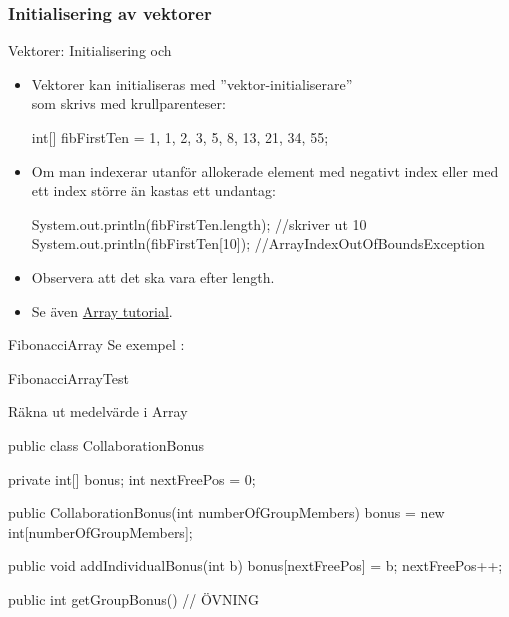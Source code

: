 \documentclass{lecturenotes}
\begin{document}
\subsubsection{Initialisering av vektorer}
\begin{Slide}{Vektorer: Initialisering och }
\begin{itemize} \footnotesize
\item Vektorer kan initialiseras med ''vektor-initialiserare'' \\ \href{https://docs.oracle.com/javase/specs/jls/se8/html/jls-10.html#jls-10.6}{} som skrivs med krullparenteser:
\begin{Code}
int[] fibFirstTen = {1, 1, 2, 3, 5, 8, 13, 21, 34, 55};
\end{Code}
\item  Om man indexerar utanför allokerade element med negativt index eller med ett index större än  kastas ett undantag:
\begin{Code}
System.out.println(fibFirstTen.length);  //skriver ut 10
System.out.println(fibFirstTen[10]); //ArrayIndexOutOfBoundsException
\end{Code}
\item  Observera att det  ska vara \code{()} efter length.
\item Se även \href{https://docs.oracle.com/javase/tutorial/java/nutsandbolts/arrays.html}{Array tutorial}.
\end{itemize}  
\end{Slide} 

\begin{Slide}{FibonacciArray}
Se exempel \href{https://github.com/bjornregnell/lth-eda016-2015/blob/master/lectures/examples/eclipse-ws/lecture-examples/src/week06/FibonacciArray.java}{}:

\end{Slide}

\begin{Slide}{FibonacciArrayTest}

\end{Slide}

\begin{Slide}{Räkna ut medelvärde i Array}
\begin{Code}
public class CollaborationBonus {
    private int[] bonus;
    int nextFreePos = 0;

    public CollaborationBonus(int numberOfGroupMembers){
        bonus = new int[numberOfGroupMembers];
    }
    
    public void addIndividualBonus(int b){
        bonus[nextFreePos] = b;
        nextFreePos++;
    }
    
    public int getGroupBonus(){
        // ÖVNING
     }
}
\end{Code}
\end{Slide}
\end{document}
